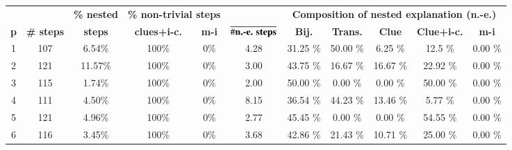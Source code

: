 \begin{table}[t]
	\centering
	\begin{tabular}{c|cc|cc|c|ccccc}
		           &                    & \textbf{\% nested} & \multicolumn{2}{c|}{\textbf{\% non-trivial steps}} & \multicolumn{1}{c|}{} & \multicolumn{5}{c}{\textbf{Composition of nested explanation (n.-e.)}}                                                                                       \\
		\textbf{p} & \textbf{\# steps } & \textbf{steps}     & \textbf{clues+i-c.}                                & \textbf{m-i}          & \textbf{$\overline{ \# \text{\textbf{n.-e. steps}}}$}                  & \textbf{Bij.} & \textbf{Trans.} & \textbf{Clue} & \textbf{Clue+i-c.} & \textbf{m-i} \\\hline
		1          & 107                & 6.54\%             & 100\%                                              & 0\%                   & 4.28                                                                   & 31.25 \%      & 50.00 \%        & 6.25 \%       & 12.5 \%            & 0.00 \%      \\
		2          & 121                & 11.57\%            & 100\%                                              & 0\%                   & 3.00                                                                   & 43.75 \%      & 16.67 \%        & 16.67 \%      & 22.92 \%           & 0.00 \%      \\
		3          & 115                & 1.74\%             & 100\%                                              & 0\%                   & 2.00                                                                   & 50.00 \%      & 0.00 \%         & 0.00 \%       & 50.00 \%           & 0.00 \%      \\
		4          & 111                & 4.50\%             & 100\%                                              & 0\%                   & 8.15                                                                   & 36.54 \%      & 44.23 \%        & 13.46 \%      & 5.77 \%            & 0.00 \%      \\
		5          & 121                & 4.96\%             & 100\%                                              & 0\%                   & 2.77                                                                   & 45.45 \%      & 0.00 \%         & 0.00 \%       & 54.55 \%           & 0.00 \%      \\
		6          & 116                & 3.45\%             & 100\%                                              & 0\%                   & 3.68                                                                   & 42.86 \%      & 21.43 \%        & 10.71 \%      & 25.00 \%           & 0.00 \%      \\

\end{tabular}
\end{table}
